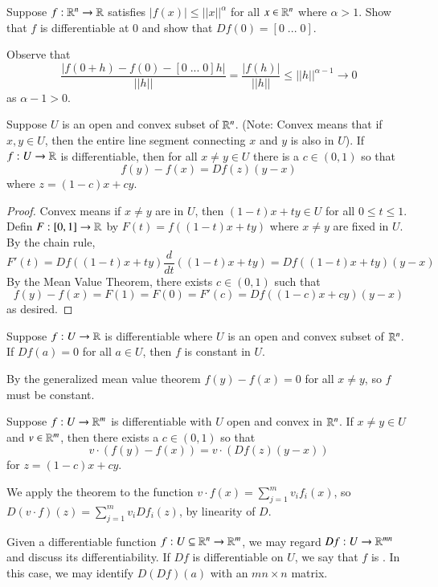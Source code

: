 \begin{eg}
    Suppose $f:\mathbb R^n\rightarrow \mathbb R$ satisfies $|f(x)| \leq ||x||^{\alpha}$ for all $x \in \mathbb R^n$ where $\alpha > 1$. Show that $f$ is differentiable at $0$ and show that $Df(0) = [0\;...\;0]$.
    
    Observe that $$\frac{|f(0+h)-f(0)-[0\;...\;0]h|}{||h||} = \frac{|f(h)|}{||h||} \leq ||h||^{\alpha -1}\rightarrow 0$$ as $\alpha - 1 > 0$.
\end{eg}

\begin{namthm}
    Suppose $U$ is an open and convex subset of $\mathbb R^n$. (Note: Convex means that if $x,y \in U$, then the entire line segment connecting $x$ and $y$ is also in $U$). If $f:U\rightarrow \mathbb R$ is differentiable, then for all $x \neq y \in U$ there is a $c \in (0,1)$ so that $$f(y) - f(x) = Df(z)(y-x)$$ where $z = (1-c)x+cy$.
\end{namthm}
\begin{proof}
    Convex means if $x \neq y$ are in $U$, then $(1-t)x+ty \in U$ for all $0 \leq t \leq 1$. Defin $F:[0,1]\rightarrow \mathbb R$ by $F(t) = f((1-t)x+ty)$ where $x \neq y$ are fixed in $U$. By the chain rule, $$F'(t) = Df((1-t)x+ty)\frac{d}{dt}((1-t)x+ty) = Df((1-t)x+ty)(y-x)$$ By the Mean Value Theorem, there exists $c \in (0,1)$ such that $$f(y) - f(x) = F(1) = F(0) = F'(c) = Df((1-c)x+cy)(y-x)$$ as desired.
\end{proof}

\begin{cor}
    Suppose $f:U\rightarrow \mathbb R$ is differentiable where $U$ is an open and convex subset of $\mathbb R^n$. If $Df(a) = 0$ for all $a \in U$, then $f$ is constant in $U$.
\end{cor}
By the generalized mean value theorem $f(y)-f(x) = 0$ for all $x \neq y$, so $f$ must be constant.

\begin{cor}
    Suppose $f:U\rightarrow \mathbb R^m$ is differentiable with $U$ open and convex in $\mathbb R^n$. If $x \neq y \in U$ and $v \in \mathbb R^m$, then there exists a $c \in (0,1)$ so that $$v\cdot(f(y) - f(x)) = v\cdot(Df(z)(y-x))$$ for $z  = (1-c)x+cy$.
\end{cor}
We apply the theorem to the function $v\cdot f(x) = \sum_{j=1}^mv_if_i(x)$, so $D(v\cdot f)(z) = \sum_{j=1}^mv_iDf_i(z)$, by linearity of $D$.

\begin{defn}
    Given a differentiable function $f:U\subseteq \mathbb R^n\rightarrow \mathbb R^m$, we may regard $Df:U\rightarrow \mathbb R^{mn}$ and discuss its differentiability. If $Df$ is differentiable on $U$, we say that $f$ is . In this case, we may identify $D(Df)(a)$ with an $mn\times n$ matrix.
\end{defn}

